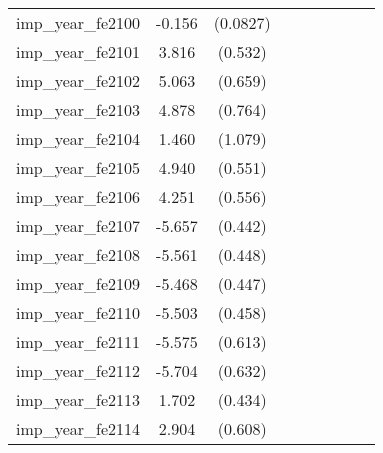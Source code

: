 {\begin{tabular}{l*{4}{cc}}
imp\_year\_fe2100&   -0.156         & (0.0827)&                  &         &                  &         &                  &         \\
imp\_year\_fe2101&    3.816\sym{***}&  (0.532)&                  &         &                  &         &                  &         \\
imp\_year\_fe2102&    5.063\sym{***}&  (0.659)&                  &         &                  &         &                  &         \\
imp\_year\_fe2103&    4.878\sym{***}&  (0.764)&                  &         &                  &         &                  &         \\
imp\_year\_fe2104&    1.460         &  (1.079)&                  &         &                  &         &                  &         \\
imp\_year\_fe2105&    4.940\sym{***}&  (0.551)&                  &         &                  &         &                  &         \\
imp\_year\_fe2106&    4.251\sym{***}&  (0.556)&                  &         &                  &         &                  &         \\
imp\_year\_fe2107&   -5.657\sym{***}&  (0.442)&                  &         &                  &         &                  &         \\
imp\_year\_fe2108&   -5.561\sym{***}&  (0.448)&                  &         &                  &         &                  &         \\
imp\_year\_fe2109&   -5.468\sym{***}&  (0.447)&                  &         &                  &         &                  &         \\
imp\_year\_fe2110&   -5.503\sym{***}&  (0.458)&                  &         &                  &         &                  &         \\
imp\_year\_fe2111&   -5.575\sym{***}&  (0.613)&                  &         &                  &         &                  &         \\
imp\_year\_fe2112&   -5.704\sym{***}&  (0.632)&                  &         &                  &         &                  &         \\
imp\_year\_fe2113&    1.702\sym{***}&  (0.434)&                  &         &                  &         &                  &         \\
imp\_year\_fe2114&    2.904\sym{***}&  (0.608)&                  &         &                  &         &                  &         \\

\end{tabular}}
